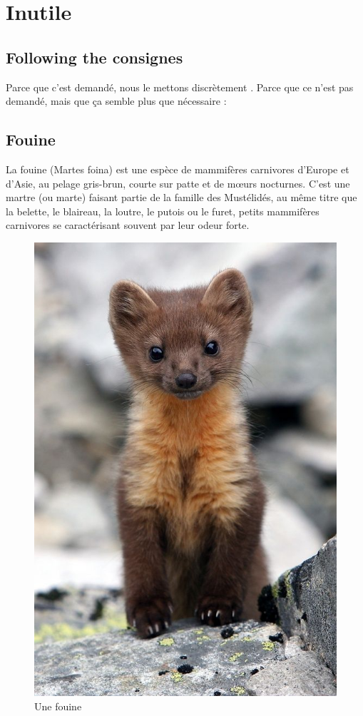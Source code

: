 \documentclass{article}
\begin{document}
	\section{Inutile}
	\subsection{Following the consignes}
	Parce que c'est demandé, nous le mettons discrètement \cite{Landin:1966:NPL:365230.365257}. Parce que ce n'est pas demandé, mais que ça semble plus que nécessaire : 
	
	\subsection{Fouine}
	La fouine (Martes foina) est une espèce de mammifères carnivores d'Europe et d'Asie, au pelage gris-brun, courte sur patte et de mœurs nocturnes. C'est une martre (ou marte) faisant partie de la famille des Mustélidés, au même titre que la belette, le blaireau, la loutre, le putois ou le furet, petits mammifères carnivores se caractérisant souvent par leur odeur forte.\cite{wiki:Fouine}
	
	\begin{figure}[h]
		\centering
		\includegraphics[scale=0.3]{img/fouine}
		\caption{Une fouine}
	\end{figure}
	
\end{document}
